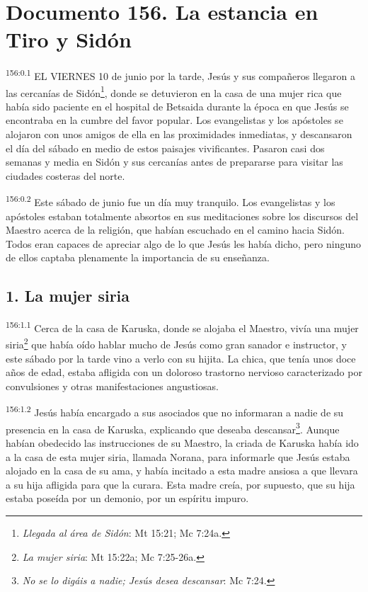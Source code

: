 \chapter{Documento 156. La estancia en Tiro y Sidón}
\par
\textsuperscript{156:0.1} EL VIERNES 10 de junio por la tarde, Jesús y sus compañeros llegaron a las cercanías de Sidón\footnote{\textit{Llegada al área de Sidón}: Mt 15:21; Mc 7:24a.}, donde se detuvieron en la casa de una mujer rica que había sido paciente en el hospital de Betsaida durante la época en que Jesús se encontraba en la cumbre del favor popular. Los evangelistas y los apóstoles se alojaron con unos amigos de ella en las proximidades inmediatas, y descansaron el día del sábado en medio de estos paisajes vivificantes. Pasaron casi dos semanas y media en Sidón y sus cercanías antes de prepararse para visitar las ciudades costeras del norte.

\par
\textsuperscript{156:0.2} Este sábado de junio fue un día muy tranquilo. Los evangelistas y los apóstoles estaban totalmente absortos en sus meditaciones sobre los discursos del Maestro acerca de la religión, que habían escuchado en el camino hacia Sidón. Todos eran capaces de apreciar algo de lo que Jesús les había dicho, pero ninguno de ellos captaba plenamente la importancia de su enseñanza.

\section*{1. La mujer siria}
\par
\textsuperscript{156:1.1} Cerca de la casa de Karuska, donde se alojaba el Maestro, vivía una mujer siria\footnote{\textit{La mujer siria}: Mt 15:22a; Mc 7:25-26a.} que había oído hablar mucho de Jesús como gran sanador e instructor, y este sábado por la tarde vino a verlo con su hijita. La chica, que tenía unos doce años de edad, estaba afligida con un doloroso trastorno nervioso caracterizado por convulsiones y otras manifestaciones angustiosas.

\par
\textsuperscript{156:1.2} Jesús había encargado a sus asociados que no informaran a nadie de su presencia en la casa de Karuska, explicando que deseaba descansar\footnote{\textit{No se lo digáis a nadie; Jesús desea descansar}: Mc 7:24.}. Aunque habían obedecido las instrucciones de su Maestro, la criada de Karuska había ido a la casa de esta mujer siria, llamada Norana, para informarle que Jesús estaba alojado en la casa de su ama, y había incitado a esta madre ansiosa a que llevara a su hija afligida para que la curara. Esta madre creía, por supuesto, que su hija estaba poseída por un demonio, por un espíritu impuro.

